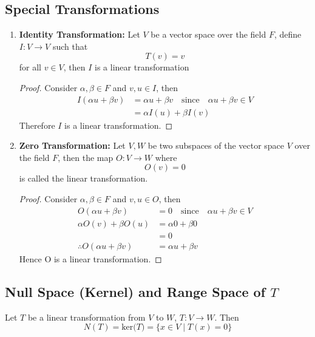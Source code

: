 \documentclass[a4paper, titlepage]{article}
\begin{document}
    \subsection{Special Transformations}
        \begin{enumerate}[label=\textbf{\arabic*}]
            \item \textbf{Identity Transformation: }Let $V$ be a vector 
            space over the field $F$, define $I: V \rightarrow V$
            such that \[ T(v) = v \] for all $v \in V$, then $I$ is a linear
            transformation
            \begin{proof}
                Consider $\alpha, \beta \in F$ and $v, u \in I$, then 
                \begin{align*}
                    I(\alpha u + \beta v) &= \alpha u + \beta v \quad 
                    \text{since} \quad \alpha u + \beta v \in V \\
                                        &= \alpha I(u) + \beta I(v)
                \end{align*}
                Therefore $I$ is a linear transformation.
            \end{proof}
            \item \textbf{Zero Transformation: }Let $V, W$ be two subspaces 
            of the vector space $V$ over the field $F$, then the map
            $O: V \rightarrow W$ where $$O(v) = 0$$ is called the 
            linear transformation.
            \begin{proof}
                Consider $\alpha, \beta \in F$ and $v, u \in O$, then 
                \begin{align*}
                    O(\alpha u + \beta v) &= 0 \quad 
                    \text{since} \quad \alpha u + \beta v \in V \\
                    \alpha O(v) + \beta O(u) &= \alpha 0 + \beta 0 \\
                                            &= 0 \\
                    \therefore O(\alpha u + \beta v) &= \alpha u + \beta v
                \end{align*}
                Hence O is a linear transformation.
            \end{proof}
        \end{enumerate}
    
    \subsection{Null Space (Kernel) and Range Space of $T$}
        Let $T$ be a linear transformation from $V$ to $W$, 
        $T: V \rightarrow W$. Then 
        $$ N(T) = \text{ker($T$)} = \{ x \in V \; | \; T(x) = 0 \} $$
        
\end{document}
